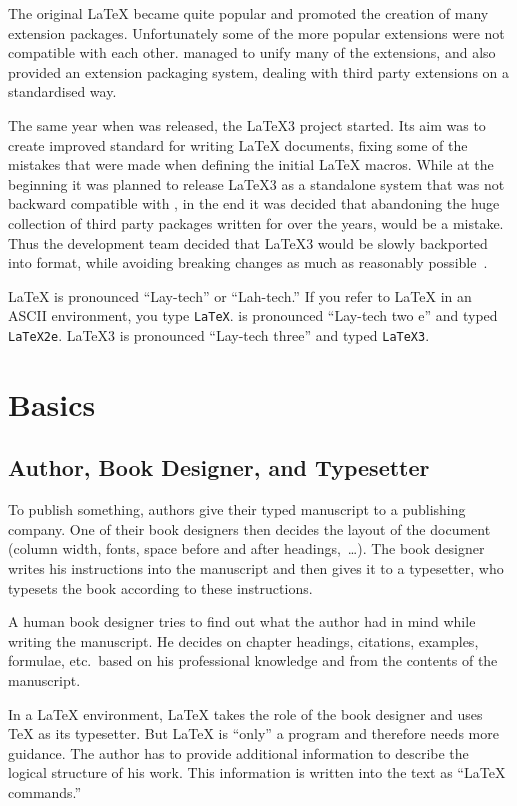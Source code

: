The original \LaTeX{} became quite popular and promoted the creation of many
extension packages. Unfortunately some of the more popular extensions were not
compatible with each other. \LaTeXe{} managed to unify many of the extensions,
and also provided an extension packaging system, dealing with third party
extensions on a standardised way.

The same year when \LaTeXe{} was released, the \LaTeX3 project started. Its aim
was to create improved standard for writing \LaTeX{} documents, fixing some of
the mistakes that were made when defining the initial \LaTeX{} macros. While at
the beginning it was planned to release \LaTeX3 as a standalone system that was
not backward compatible with \LaTeXe{}, in the end it was decided that
abandoning the huge collection of third party packages written for \LaTeXe{}
over the years, would be a mistake. Thus the development team decided that
\LaTeX3 would be slowly backported into \LaTeXe{} format, while avoiding
breaking changes as much as reasonably possible~\cite{quovadis}.

\LaTeX{} is pronounced ``Lay-tech'' or ``Lah-tech.'' If you refer to
\LaTeX{} in an ASCII environment, you type \texttt{LaTeX}.
\LaTeXe{} is pronounced ``Lay-tech two e'' and typed \texttt{LaTeX2e}.
\LaTeX3 is pronounced ``Lay-tech three'' and typed \texttt{LaTeX3}.

\section{Basics}

\subsection{Author, Book Designer, and Typesetter}

To publish something, authors give their typed manuscript to a
publishing company. One of their book designers then
decides the layout of the document (column width, fonts, space before
and after headings,~\ldots). The book designer writes his instructions
into the manuscript and then gives it to a typesetter, who typesets the
book according to these instructions.

A human book designer tries to find out what the author had in mind
while writing the manuscript. He decides on chapter headings,
citations, examples, formulae, etc.\ based on his professional
knowledge and from the contents of the manuscript.

In a \LaTeX{} environment, \LaTeX{} takes the role of the book
designer and uses \TeX{} as its typesetter. But \LaTeX{} is ``only'' a
program and therefore needs more guidance. The author has to provide
additional information to describe the logical structure of his
work. This information is written into the text as ``\LaTeX{}
commands.''

